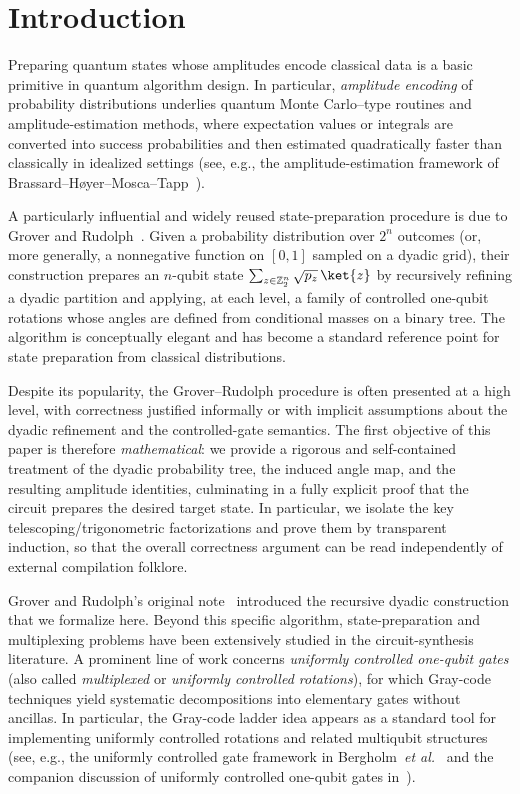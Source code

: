 \documentclass{article}
\numberwithin{equation}{section}
\begin{document}
\section{Introduction}

Preparing quantum states whose amplitudes encode classical data is a basic primitive in quantum
algorithm design. In particular, \emph{amplitude encoding} of probability distributions underlies
quantum Monte Carlo–type routines and amplitude-estimation methods, where expectation values or
integrals are converted into success probabilities and then estimated quadratically faster than
classically in idealized settings (see, e.g., the amplitude-estimation framework of
Brassard--H{\o}yer--Mosca--Tapp~\cite{Brassard2000}).

A particularly influential and widely reused state-preparation procedure is due to Grover and
Rudolph~\cite{GroverRudolph2002}. Given a probability distribution over $2^n$ outcomes (or, more generally, a nonnegative function on
$[0,1]$ sampled on a dyadic grid), their construction prepares an $n$-qubit state
$\sum_{z\in\mathbb{Z}_2^n}\sqrt{p_z}\,\ket{z}$ by recursively refining a dyadic partition and applying, at each
level, a family of controlled one-qubit rotations whose angles are defined from conditional masses on a
binary tree. The algorithm is conceptually elegant and has become a standard reference point for
state preparation from classical distributions.

Despite its popularity, the Grover--Rudolph procedure is often presented at a high level, with correctness
justified informally or with implicit assumptions about the dyadic refinement and the controlled-gate
semantics. The first objective of this paper is therefore \emph{mathematical}: we provide a rigorous and
self-contained treatment of the dyadic probability tree, the induced angle map, and the resulting
amplitude identities, culminating in a fully explicit proof that the circuit prepares the desired target
state. In particular, we isolate the key telescoping/trigonometric factorizations and prove them by
transparent induction, so that the overall correctness argument can be read independently of external
compilation folklore.

Grover and Rudolph's original note~\cite{GroverRudolph2002} introduced the recursive dyadic construction that we formalize here. Beyond this specific algorithm,
state-preparation and multiplexing problems have been extensively studied in the circuit-synthesis
literature. A prominent line of work concerns \emph{uniformly controlled one-qubit gates} (also called
\emph{multiplexed} or \emph{uniformly controlled rotations}), for which Gray-code techniques yield
systematic decompositions into elementary gates without ancillas. In particular, the Gray-code ladder
idea appears as a standard tool for implementing uniformly controlled rotations and related multiqubit
structures (see, e.g., the uniformly controlled gate framework in
Bergholm~\emph{et al.}~\cite{Bergholm2005} and the companion discussion of uniformly
controlled one-qubit gates in~\cite{Mottonen2004}).
\end{document}
